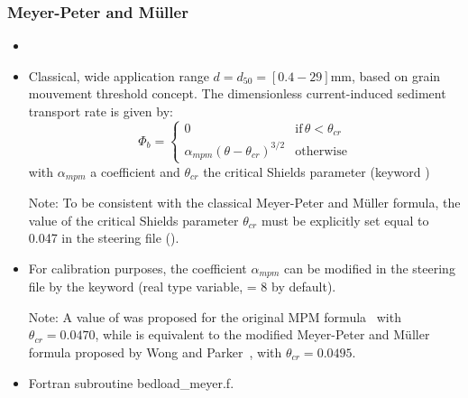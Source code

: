 \subsubsection{Meyer-Peter and M\"uller}
\begin{itemize}
\item {}
\item Classical, wide application range $d=d_{50} = [0.4-29]$mm, based on grain mouvement threshold concept. The dimensionless current-induced sediment transport rate is given by:
\begin{equation*}
\Phi_b=\left\{\begin{array}{ll}
0 & \text{if}\,\theta<\theta_{cr}\\
\alpha_{mpm}(\theta-\theta_{cr})^{3/2} & \text{otherwise}
\end{array}
\right.
\end{equation*}
with $\alpha_{mpm}$ a coefficient and $\theta_{cr}$ the critical Shields parameter (keyword )

   \begin{WarningBlock}{Note:}
  To be consistent with the classical Meyer-Peter and M\"uller formula, the value of the critical Shields parameter $\theta_{cr}$ must be explicitly set equal to 0.047 in the steering file ().
\end{WarningBlock}

\item For calibration purposes, the coefficient $\alpha_{mpm}$ can be modified in the steering file by the keyword  (real type variable, {\ttfamily = 8} by default).

  \begin{WarningBlock}{Note:}
  A value of  was proposed for the original MPM formula~\cite{GarciaBook2006} with $\theta_{cr}=0.0470$, while  is equivalent to the modified Meyer-Peter and M\"uller formula proposed by Wong and Parker~\cite{WongParker06}, with $\theta_{cr}=0.0495$.
  \end{WarningBlock}



\item Fortran subroutine {\ttfamily bedload\_meyer.f}.

\end{itemize}

